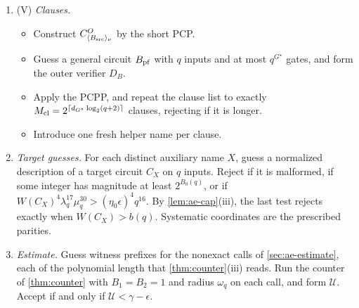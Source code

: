 \documentclass[11pt,letterpaper]{article}
\theoremstyle{definition}
\theoremstyle{remark}
\newcommand{\lgx}{\log_2}
\begin{document}
\begin{enumerate}[label=(M\arabic*)]
\(i<N\).
\item (V) \emph{Clauses.}
\begin{itemize}
\item Construct \(C^O_{\langle B_{\rm src}\rangle_\nu}\) by the short
PCP.
\item Guess a general circuit \(B_{\rm pf}\) with \(q\) inputs and at
most \(q^{G^\star}\) gates, and form the outer verifier \(D_B\).
\item Apply the PCPP, and repeat the clause list to exactly
\(M_{\rm cl}=2^{\lceil d_{G^\star}\lgx(q+2)\rceil}\) clauses, rejecting if it
is longer.
\item Introduce one fresh helper name per clause.
\end{itemize}
\item \emph{Target guesses.} For each distinct auxiliary name \(X\),
guess a normalized description of a target circuit \(C_X\) on \(q\)
inputs. Reject if it is malformed, if some integer has magnitude at
least \(2^{B_0(q)}\), or if
\(W(C_X)^4\lambda_q^{17}\mu_q^{30}>(\eta_0\epsilon)^4q^{16}\). By
\cref{lem:ae-cap}(iii), the last test rejects exactly when
\(W(C_X)>b(q)\). Systematic coordinates are the prescribed parities.
\item \emph{Estimate.} Guess witness prefixes for the nonexact calls
of \cref{sec:ae-estimate}, each of the polynomial length that
\cref{thm:counter}(iii) reads. Run the counter of \cref{thm:counter}
with \(B_1=B_2=1\) and radius \(\omega_q\) on each call, and form
\(\mathcal U\). Accept if and only if \(\mathcal U<\gamma-\epsilon\).
\end{enumerate}
\end{document}
